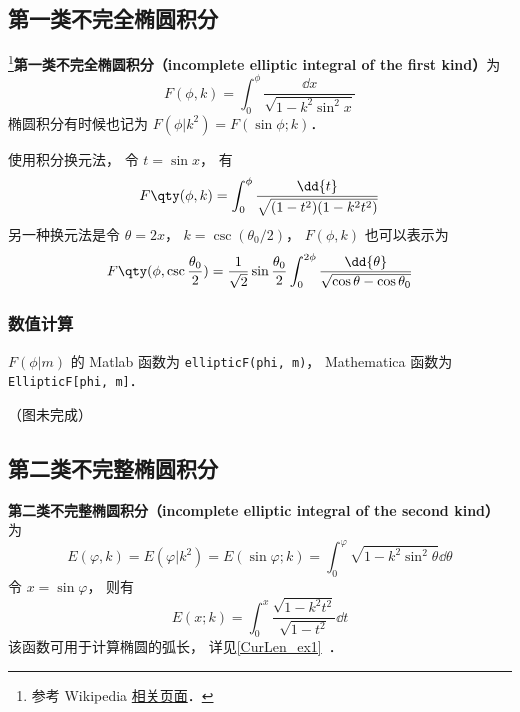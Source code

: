 

\subsection{第一类不完全椭圆积分}
\footnote{参考 Wikipedia \href{https://en.wikipedia.org/wiki/Elliptic_integral}{相关页面}．}\textbf{第一类不完全椭圆积分（incomplete elliptic integral of the first kind）}为
\begin{equation}\label{EliInt_eq1}
F(\phi, k) = \int_0^\phi \frac{\dd{x}}{\sqrt{1 - k^2\sin^2 x}}
\end{equation}
椭圆积分有时候也记为 $F(\phi | k^2) = F(\sin\phi ; k)$．

使用积分换元法， 令 $t = \sin x$， 有
\begin{equation}
F\qty(\phi, k) = \int_0^\phi \frac{\dd{t}}{\sqrt{(1 - t^2)(1 - k^2 t^2)}}
\end{equation}
另一种换元法是令 $\theta = 2x$， $k = \csc(\theta_0/2)$， $F(\phi, k)$ 也可以表示为
\begin{equation}\label{EliInt_eq2}
F\qty(\phi, \csc\frac{\theta_0}{2}) = \frac{1}{\sqrt{2}} \sin\frac{\theta_0}{2} \int_0^{2\phi} \frac{\dd{\theta}}{\sqrt{\cos\theta - \cos\theta_0}}
\end{equation}

\subsubsection{数值计算}
$F(\phi | m)$ 的 Matlab 函数为 \verb|ellipticF(phi, m)|， %
Mathematica 函数为 \verb|EllipticF[phi, m]|．

（图未完成）

\subsection{第二类不完整椭圆积分}
\textbf{第二类不完整椭圆积分（incomplete elliptic integral of the second kind）}为
\begin{equation}\label{EliInt_eq3}
E(\varphi, k) = E(\varphi | k^2) = E(\sin\varphi; k) = \int_0^\varphi \sqrt{1 - k^2\sin^2\theta} \dd{\theta}
\end{equation}
令 $x = \sin\varphi$， 则有
\begin{equation}
E(x; k) = \int_0^x \frac{\sqrt{1 - k^2t^2}}{\sqrt{1 - t^2}}\dd{t}
\end{equation}
该函数可用于计算椭圆的弧长， 详见\autoref{CurLen_ex1}~．

